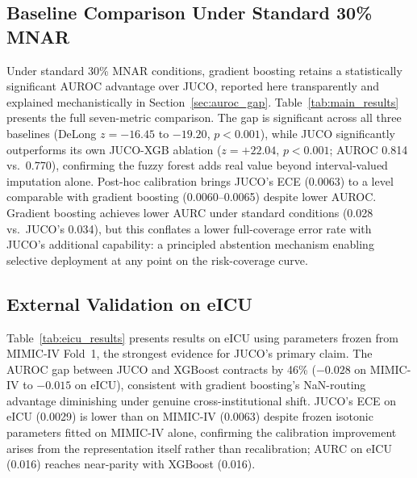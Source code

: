 \documentclass[journal]{IEEEtran}
\begin{document}
	\subsection{Baseline Comparison Under Standard 30\% MNAR}
	\label{sec:baseline_results}
	
	Under standard 30\% MNAR conditions, gradient boosting retains a statistically significant AUROC advantage over JUCO, reported here transparently and explained mechanistically in Section~\ref{sec:auroc_gap}. Table~\ref{tab:main_results} presents the full seven-metric comparison. The gap is significant across all three baselines (DeLong $z=-16.45$ to $-19.20$, $p<0.001$), while JUCO significantly outperforms its own JUCO-XGB ablation ($z=+22.04$, $p<0.001$; AUROC 0.814 vs.\ 0.770), confirming the fuzzy forest adds real value beyond interval-valued imputation alone. Post-hoc calibration brings JUCO's ECE (0.0063) to a level comparable with gradient boosting (0.0060--0.0065) despite lower AUROC. Gradient boosting achieves lower AURC under standard conditions (0.028 vs.\ JUCO's 0.034), but this conflates a lower full-coverage error rate with JUCO's additional capability: a principled abstention mechanism enabling selective deployment at any point on the risk-coverage curve.
	
	
	
	\subsection{External Validation on eICU}
	\label{sec:eicu_results}
	
	Table~\ref{tab:eicu_results} presents results on eICU using parameters frozen from MIMIC-IV Fold~1, the strongest evidence for JUCO's primary claim. The AUROC gap between JUCO and XGBoost contracts by 46\% ($-0.028$ on MIMIC-IV to $-0.015$ on eICU), consistent with gradient boosting's NaN-routing advantage diminishing under genuine cross-institutional shift. JUCO's ECE on eICU (0.0029) is lower than on MIMIC-IV (0.0063) despite frozen isotonic parameters fitted on MIMIC-IV alone, confirming the calibration improvement arises from the representation itself rather than recalibration; AURC on eICU (0.016) reaches near-parity with XGBoost (0.016).
	
\end{document}
